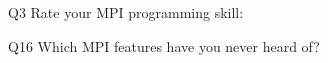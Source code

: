 \begin{description}%
\item{Q3} Rate your MPI programming skill:%
\item{Q16} Which MPI features have you never heard of?%
\end{description}%
